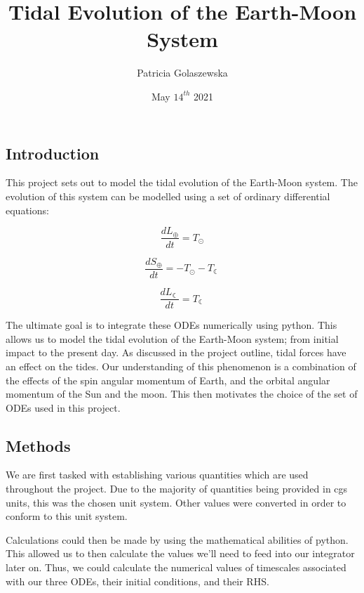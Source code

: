\documentclass{article}
\title{Tidal Evolution of the Earth-Moon System}
\author{Patricia Golaszewska}
\date{May $14^{th}$ 2021}
\begin{document}
\maketitle

\newpage

\begin{center}
    \section*{Introduction}
\end{center}

This project sets out to model the tidal evolution of the Earth-Moon system. The evolution of this system can be modelled using a set of ordinary differential equations:

\begin{equation}
   \frac{dL_{\oplus}}{dt} = T_{\odot}
\end{equation}

\begin{equation}
   \frac{dS_{\oplus}}{dt} = -T_{\odot} - T_{\leftmoon}
\end{equation}

\begin{equation}
   \frac{dL_{\leftmoon}}{dt} = T_{\leftmoon}
\end{equation}

The ultimate goal is to integrate these ODEs numerically using python. This allows us to model the tidal evolution of the Earth-Moon system; from initial impact to the present day. As discussed in the project outline, tidal forces have an effect on the tides. Our understanding of this phenomenon is a combination of the effects of the spin angular momentum of Earth, and the orbital angular momentum of the Sun and the moon. This then motivates the choice of the set of ODEs used in this project.


\begin{center}
    \section*{Methods}
\end{center}

We are first tasked with establishing various quantities which are used throughout the project. Due to the majority of quantities being provided in cgs units, this was the chosen unit system. Other values were converted in order to conform to this unit system.

Calculations could then be made by using the mathematical abilities of python. This allowed us to then calculate the values we'll need to feed into our integrator later on. Thus, we could calculate the numerical values of timescales associated with our three ODEs, their initial conditions, and their RHS. 
\end{document}
